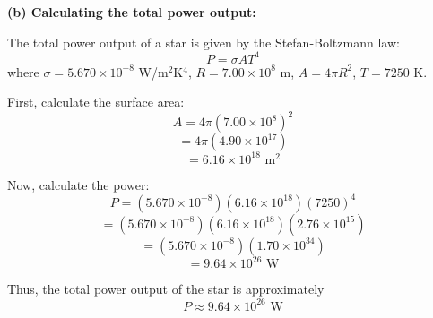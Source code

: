 \documentclass[addpoints]{exam}
\begin{document}
\begin{questions}
\begin{solution}
\textbf{(b) Calculating the total power output:}  

The total power output of a star is given by the Stefan-Boltzmann law:  
\[
P = \sigma A T^4
\]
where  
\( \sigma = 5.670 \times 10^{-8} \) W/m\(^2\)K\(^4\),  
\( R = 7.00 \times 10^8 \) m,  
\( A = 4\pi R^2 \),  
\( T = 7250 \) K.  

First, calculate the surface area:  
\[
A = 4 \pi (7.00 \times 10^8)^2
\]
\[
= 4 \pi (4.90 \times 10^{17})
\]
\[
= 6.16 \times 10^{18} \text{ m}^2
\]

Now, calculate the power:  
\[
P = (5.670 \times 10^{-8}) (6.16 \times 10^{18}) (7250)^4
\]
\[
= (5.670 \times 10^{-8}) (6.16 \times 10^{18}) (2.76 \times 10^{15})
\]
\[
= (5.670 \times 10^{-8}) (1.70 \times 10^{34})
\]
\[
= 9.64 \times 10^{26} \text{ W}
\]

Thus, the total power output of the star is approximately  
\[
P \approx 9.64 \times 10^{26} \text{ W}
\]
\end{solution}


\end{questions}
\end{document}
